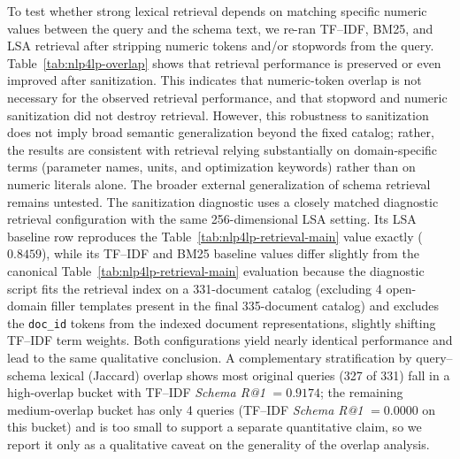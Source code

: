 \documentclass[3p]{elsarticle}
\begin{document}
To test whether strong lexical retrieval depends on matching specific numeric values between the query and the schema text, we re-ran TF--IDF, BM25, and LSA retrieval after stripping numeric tokens and/or stopwords from the query. Table~\ref{tab:nlp4lp-overlap} shows that retrieval performance is preserved or even improved after sanitization. This indicates that numeric-token overlap is not necessary for the observed retrieval performance, and that stopword and numeric sanitization did not destroy retrieval. However, this robustness to sanitization does not imply broad semantic generalization beyond the fixed catalog; rather, the results are consistent with retrieval relying substantially on domain-specific terms (parameter names, units, and optimization keywords) rather than on numeric literals alone. The broader external generalization of schema retrieval remains untested. The sanitization diagnostic uses a closely matched diagnostic retrieval configuration with the same 256-dimensional LSA setting. Its LSA baseline row reproduces the Table~\ref{tab:nlp4lp-retrieval-main} value exactly ($0.8459$), while its TF--IDF and BM25 baseline values differ slightly from the canonical Table~\ref{tab:nlp4lp-retrieval-main} evaluation because the diagnostic script fits the retrieval index on a 331-document catalog (excluding 4 open-domain filler templates present in the final 335-document catalog) and excludes the \texttt{doc\_id} tokens from the indexed document representations, slightly shifting TF--IDF term weights. Both configurations yield nearly identical performance and lead to the same qualitative conclusion. A complementary stratification by query--schema lexical (Jaccard) overlap shows most original queries (327 of 331) fall in a high-overlap bucket with TF--IDF \textit{Schema R@1} $=0.9174$; the remaining medium-overlap bucket has only 4 queries (TF--IDF \textit{Schema R@1} $=0.0000$ on this bucket) and is too small to support a separate quantitative claim, so we report it only as a qualitative caveat on the generality of the overlap analysis.
\end{document}
